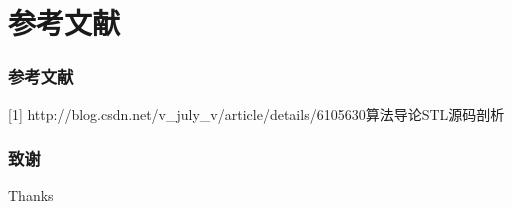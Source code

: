 \documentclass{beamer}
\begin{document}
\begin{CJK}{UTF8}{gbsn}
\begin{frame}
\begin{columns}
		\end{columns}
	\end{frame}


	\section{参考文献}
	\begin{frame}
		\frametitle{参考文献}
		[1] http://blog.csdn.net/v\_july\_v/article/details/6105630\newline
		[2] 算法导论\newline
		[3] STL源码剖析
	\end{frame}


	\begin{frame}
		\frametitle{致谢}
		Thanks
	\end{frame}


\end{CJK}
\end{document}
